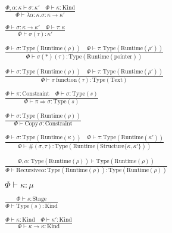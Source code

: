\documentclass {article}
\begin{document}
\begin{gather*}
\frac
{\Phi, \alpha : \kappa \vdash \sigma : \kappa' \quad \Phi \vdash \kappa : \text{Kind}} 
{\Phi \vdash \lambda \alpha : \kappa. \sigma : \kappa \to \kappa' } \\
\\
\frac
{\Phi \vdash \sigma : \kappa \to \kappa' \quad \Phi \vdash \tau : \kappa}
{\Phi \vdash \sigma (\tau) : \kappa' } \\
\\
\frac
{\Phi \vdash \sigma : \text{Type} (\text{Runtime} (\rho)) \quad \Phi \vdash \tau : \text{Type} (\text{Runtime} (\rho'))}
{\Phi \vdash \sigma (*) (\tau) : \text{Type} (\text{Runtime} (\text{pointer}))} \\
\\
\frac
{\Phi \vdash \sigma : \text{Type} (\text{Runtime} (\rho)) \quad \Phi \vdash \tau : \text{Type} (\text{Runtime} (\rho'))}
{\Phi \vdash \sigma \, \text{function} (\tau) : \text{Type} (\text{Text})} \\
\\
\frac
{\Phi \vdash \pi : \text{Constraint} \quad \Phi \vdash \sigma : \text{Type}(s)}
{\Phi \vdash \pi \Rightarrow \sigma : \text{Type}(s)} \\
\\
\frac
{\Phi \vdash \sigma : \text{Type}(\text{Runtime}(\rho))}
{\Phi \vdash \text{Copy} \, \sigma : \text{Constraint}} \\
\\
\frac
{\Phi \vdash \sigma : \text{Type}(\text{Runtime}(\kappa)) \quad \Phi \vdash \tau : \text{Type} (\text{Runtime}(\kappa')) }
{\Phi \vdash \#(\sigma, \tau) : \text{Type} (\text{Runtime} (\text{Structure} \{ \kappa,\kappa'\} ))} \\
\\
\frac
{\Phi, \alpha : \text{Type} (\text{Runtime} (\rho)) \vdash \text{Type} (\text{Runtime} (\rho)) }
{\Phi \vdash \text{Recursive} \alpha : \text{Type} (\text{Runtime} (\rho)) : \text{Type} (\text{Runtime} (\rho))  } \\
\\
\Phi \vdash \kappa : \mu \tag*{[Kind Validation]} \\
\\
\frac
{\Phi \vdash s : \text{Stage}}
{\Phi \vdash \text {Type} (s) : \text{Kind}} \\
\\
\frac
{\Phi \vdash \kappa : \text{Kind} \quad \Phi \vdash \kappa' : \text{Kind}}
{\Phi \vdash \kappa \to \kappa : \text{Kind} } \\
\\

\end{gather*}
\end{document}
